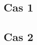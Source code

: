 \documentclass{article}
\begin{document}
		\section{}
		\section{}
		\subsection{Cas 1}
		
		\subsection{Cas 2}
		
		\section{}
		
		
		\section{}
		
\end{document}
